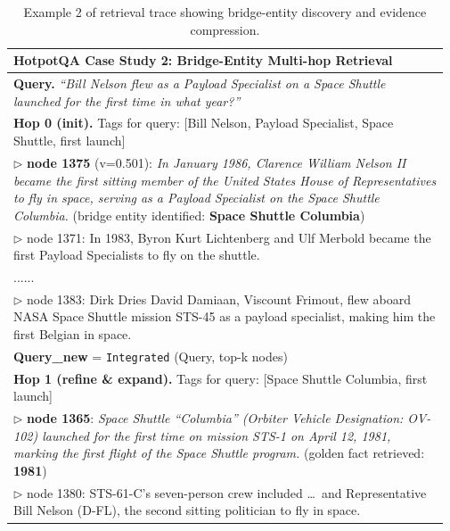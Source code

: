\begin{table}[H]
\centering
\small
\caption{Example 2 of retrieval trace showing bridge-entity discovery and evidence compression.}
\label{tab:case_hotpotqa_2}

\setlength{\tabcolsep}{8pt}
\renewcommand{\arraystretch}{1.1}
\begin{tabular}{p{0.97\linewidth}}

\toprule
\textbf{HotpotQA Case Study 2: Bridge-Entity Multi-hop Retrieval}\\
\midrule
\textbf{Query.} \emph{``Bill Nelson flew as a Payload Specialist on a Space Shuttle launched for the first time in what year?''}\\
\midrule
\textbf{Hop 0 (init).} Tags for query:
{[\textcolor{yes}{Bill Nelson}, \textcolor{partial}{Payload Specialist}, \textcolor{partial}{Space Shuttle}, \textcolor{no}{first launch}]}\\
\(\triangleright\) \textbf{node 1375} (v=0.501):
\emph{In January 1986, Clarence William Nelson II became the first sitting member of the United States House of Representatives to fly in space, serving as a Payload Specialist on the Space Shuttle Columbia.}
(\textcolor{yes}{bridge entity identified: \textbf{Space Shuttle Columbia}})\\
\(\triangleright\) node 1371:
In 1983, Byron Kurt Lichtenberg and Ulf Merbold became the first Payload Specialists to fly on the shuttle.\\
......\\
\(\triangleright\) node 1383:
Dirk Dries David Damiaan, Viscount Frimout, flew aboard NASA Space Shuttle mission STS-45 as a payload specialist, making him the first Belgian in space.\\
\midrule
\textbf{Query\_new} = \texttt{Integrated} (Query, top-k nodes)\\
\midrule
\textbf{Hop 1 (refine \& expand).} Tags for query:
{[\textcolor{yes}{Space Shuttle Columbia}, \textcolor{yes}{first launch}]}\\
\(\triangleright\) \textbf{node 1365}:
\emph{Space Shuttle ``Columbia'' (Orbiter Vehicle Designation: OV-102) launched for the first time on mission STS-1 on April 12, 1981, marking the first flight of the Space Shuttle program.}
(\textcolor{yes}{golden fact retrieved: \textbf{1981}})\\
\(\triangleright\) node 1380:
STS-61-C's seven-person crew included \ldots\ and Representative Bill Nelson (D-FL), the second sitting politician to fly in space.\\

\end{tabular}
\end{table}
